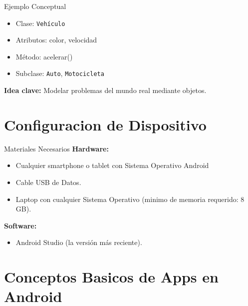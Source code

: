 \documentclass[aspectratio=169,compress]{beamer}
\begin{document}
\begin{frame}{Ejemplo Conceptual}
\begin{itemize}
    \item Clase: \texttt{Vehículo}
    \item Atributos: color, velocidad
    \item Método: acelerar()
    \item Subclase: \texttt{Auto}, \texttt{Motocicleta}
\end{itemize}

\vspace{0.5cm}

\textbf{Idea clave:} Modelar problemas del mundo real mediante objetos.
\end{frame}




\section[Config]{Configuracion de Dispositivo}

\begin{frame}{Materiales Necesarios}
\textbf{Hardware:}
\begin{itemize} 
\item Cualquier smartphone o tablet con Sistema Operativo Android 
\item Cable USB de Datos.
\item Laptop con cualquier Sistema Operativo (minimo de memoria requerido: 8 GB). 
\end{itemize}

\vspace{0.5cm} 
\textbf{Software:} 
\begin{itemize} 
\item Android Studio (la versión más reciente).
\end{itemize}
\end{frame}







\section[Conceptos]{Conceptos Basicos de Apps en Android}
\end{document}
